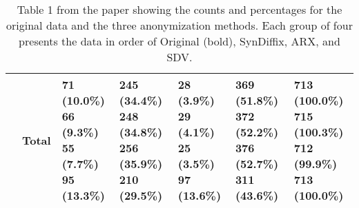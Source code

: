 \begin{table}
\begin{center}
\begin{small}
\begin{tabular}{lllllll}
& Total      & \makecell[l]{\textbf{71 (10.0\%)} \\66 (9.3\%) \\55 (7.7\%) \\95 (13.3\%) \\}      & \makecell[l]{\textbf{245 (34.4\%)} \\248 (34.8\%) \\256 (35.9\%) \\210 (29.5\%) \\}      & \makecell[l]{\textbf{28 (3.9\%)} \\29 (4.1\%) \\25 (3.5\%) \\97 (13.6\%) \\}      & \makecell[l]{\textbf{369 (51.8\%)} \\372 (52.2\%) \\376 (52.7\%) \\311 (43.6\%) \\}      & \makecell[l]{\textbf{713 (100.0\%)} \\715 (100.3\%)  \\712 (99.9\%)  \\713 (100.0\%)  \\} \\ 

      \bottomrule
      \end{tabular}
      \end{small}
      \caption{Table 1 from the paper showing the counts and percentages for the original data and the three anonymization methods. Each group of four presents the data in order of Original (bold), SynDiffix, ARX, and SDV.}
      \label{tab:table1}
      \end{center}
      \end{table}
    
